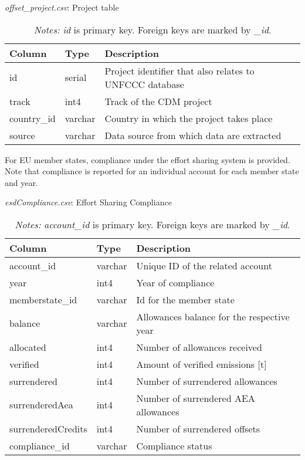 \documentclass[authoryear]{elsarticle}
\begin{document}
\begin{table}[htbp]\scriptsize
	\caption{\textit{offset\_project.csv}: Project table}\label{tab:tbl_project}
	\centering
	\begin{tabular*}{\textwidth}{@{}@{\extracolsep{\fill}} llp{8cm} @{}}
		\toprule
		\toprule
		\textbf{Column} & \textbf{Type}  & \textbf{Description} \\
		\midrule
		id    & serial & Project identifier that also relates to UNFCCC database \\
		track & int4  & Track of the CDM project \\
		country\_id & varchar & Country in which the project takes place \\
		source & varchar & Data source from which data are extracted\\
		\bottomrule
\bottomrule
\end{tabular*}%
	\vspace{-3ex}
\caption*{\footnotesize \emph{Notes:} \textit{id} is primary key. Foreign keys are marked by \textit{\_id}.}
\vspace{0ex}
\end{table}

For EU member states, compliance under the effort sharing system is provided. Note that compliance is reported for an individual account for each member state and year.
\begin{table}[htbp]\scriptsize
	\centering
	\caption{\textit{esdCompliance.csv}: Effort Sharing Compliance}
	\centering
	\begin{tabular*}{\textwidth}{@{}@{\extracolsep{\fill}} llp{8cm} @{}}
		\toprule
		\toprule
		\textbf{Column} & \textbf{Type} & \textbf{Description} \\
		\midrule
		account\_id & varchar & Unique ID of the related account \\
		year  & int4  & Year of compliance \\
		memberstate\_id & varchar & Id for the member state \\
		balance & varchar & Allowances balance for the respective year \\
		allocated & int4  & Number of allowances received \\
		verified & int4  & Amount of verified emissions [t] \\
		surrendered & int4  & Number of surrendered allowances \\
		surrenderedAea & int4  & Number of surrendered AEA allowances \\
		surrenderedCredits  & int4  & Number of surrendered offsets \\
		compliance\_id & varchar & Compliance status \\
		\bottomrule
		\bottomrule
	\end{tabular*}%
	\caption*{\footnotesize \emph{Notes:} \textit{account\_id } is primary key. Foreign keys are marked by \textit{\_id}.}
\end{table}%
\end{document}
